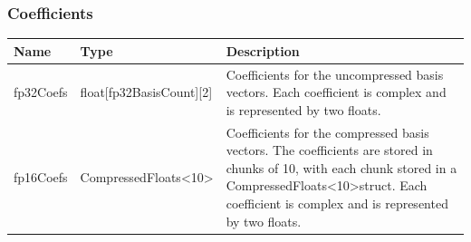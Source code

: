 \documentclass{article}
\begin{document}
\subsubsection{Coefficients}
\begin{tabular}{p{} |p{} |p{}}
\hline
Name & Type & Description\\
\hline
fp32Coefs & float[fp32BasisCount][2] & Coefficients for the uncompressed basis vectors. Each coefficient is complex and is represented by two floats.\\
fp16Coefs & CompressedFloats\textless 10\textgreater\space [2$*$fp16BasisCount/10] & Coefficients for the compressed basis vectors. The coefficients are stored in chunks of 10, with each chunk stored in a CompressedFloats\textless 10\textgreater\space struct. Each coefficient is complex and is represented by two floats.\\
\hline
\end{tabular}

\end{document}

